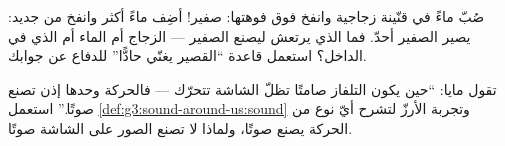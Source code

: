 \begin{exercise}[$\star\star$]\label{exo:g3:sound-around-us:10}
صُبّ ماءً في قنّينة زجاجية وانفخ فوق فوهتها: صفير! أضِف ماءً
أكثر وانفخ من جديد: يصير الصفير أحدّ. فما الذي يرتعش ليصنع
الصفير --- الزجاج أم الماء أم  الذي في الداخل؟ استعمل
قاعدة ``القصير يغنّي حادًّا'' للدفاع عن جوابك.
\end{exercise}

\begin{exercise}[$\star\star$]\label{exo:g3:sound-around-us:11}
تقول مايا: ``حين يكون التلفاز صامتًا تظلّ الشاشة تتحرّك ---
فالحركة وحدها إذن تصنع صوتًا.'' استعمل
\cref{def:g3:sound-around-us:sound} وتجربة الأرزّ لتشرح أيّ نوع
من الحركة يصنع صوتًا، ولماذا لا تصنع الصور على الشاشة صوتًا.
\end{exercise}
